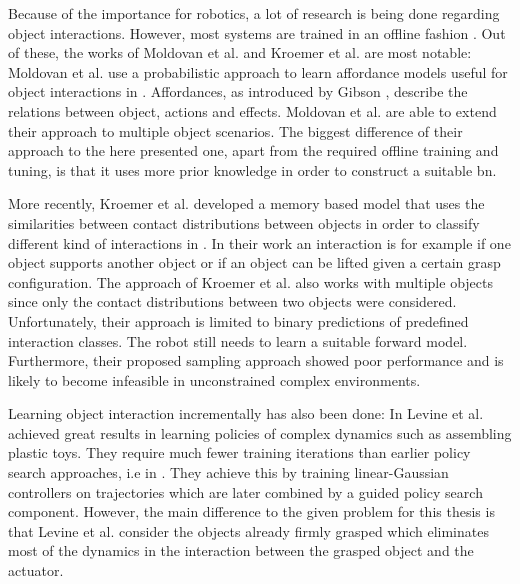Because of the importance for robotics, a lot of research is being done regarding object interactions.  However, most systems are trained in an offline fashion \cite{nishide2008predicting, moldovan2012learning, contactPrediction}. Out of these, the works of Moldovan et al. and Kroemer et al. are most notable:
Moldovan et al. use a probabilistic approach to learn affordance models useful for object interactions in \cite{moldovan2012learning}. Affordances, as introduced by Gibson \cite{affordances}, describe the relations between object, actions and effects. Moldovan et al. are able to extend their approach to multiple object scenarios. The biggest difference of their approach to the here presented one, apart from the required offline training and tuning, is that it uses more prior knowledge in order to construct a suitable \gls{bn}.

More recently, Kroemer et al. developed a memory based model that uses the similarities between contact distributions between objects in order to classify different kind of interactions in \cite{contactPrediction}. In their work an interaction is for example if one object supports another object or if an object can be lifted given a certain grasp configuration. The approach of Kroemer et al. also works with multiple objects since only the contact distributions between two objects were considered. Unfortunately, their approach is limited to binary predictions of predefined interaction classes. The robot still needs to learn a suitable forward model. Furthermore, their proposed sampling approach showed poor performance and is likely to become infeasible in unconstrained complex environments.

Learning object interaction incrementally has also been done:
In \cite{levine2015learning} Levine et al. achieved great results in learning policies of complex dynamics %
such as assembling plastic toys. They require much fewer training iterations than earlier policy search approaches, i.e in \cite{otherPolicySearchs}. They achieve this by training linear-Gaussian controllers on trajectories which are later combined by a guided policy search component.
However, the main difference to the given problem for this thesis is that Levine et al. consider the objects already firmly grasped which eliminates most of the dynamics in the interaction between the grasped object and the actuator.

